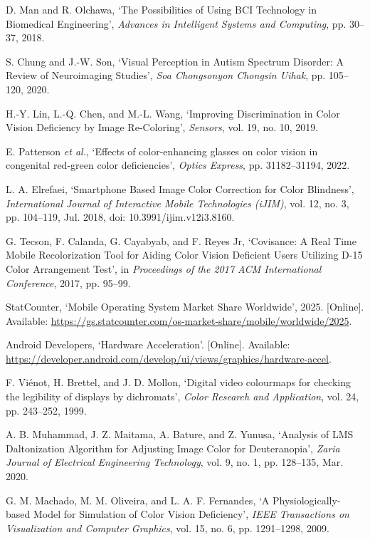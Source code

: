 {\footnotesize
\begin{enumerate}[leftmargin=1.4em, itemsep=0.3em, label={[\arabic*]}]
  \item D. Man and R. Olchawa, `The Possibilities of Using BCI Technology in Biomedical Engineering', \textit{Advances in Intelligent Systems and Computing}, pp. 30--37, 2018.
  \item S. Chung and J.-W. Son, `Visual Perception in Autism Spectrum Disorder: A Review of Neuroimaging Studies', \textit{Soa Chongsonyon Chongsin Uihak}, pp. 105--120, 2020.
  \item H.-Y. Lin, L.-Q. Chen, and M.-L. Wang, `Improving Discrimination in Color Vision Deficiency by Image Re-Coloring', \textit{Sensors}, vol. 19, no. 10, 2019.
  \item E. Patterson \textit{et al.}, `Effects of color-enhancing glasses on color vision in congenital red-green color deficiencies', \textit{Optics Express}, pp. 31182--31194, 2022.
  \item L. A. Elrefaei, `Smartphone Based Image Color Correction for Color Blindness', \textit{International Journal of Interactive Mobile Technologies (iJIM)}, vol. 12, no. 3, pp. 104--119, Jul. 2018, doi: 10.3991/ijim.v12i3.8160.
  \item G. Tecson, F. Calanda, G. Cayabyab, and F. Reyes Jr, `Covisance: A Real Time Mobile Recolorization Tool for Aiding Color Vision Deficient Users Utilizing D-15 Color Arrangement Test', in \textit{Proceedings of the 2017 ACM International Conference}, 2017, pp. 95--99.
  \item StatCounter, `Mobile Operating System Market Share Worldwide', 2025. [Online]. Available: \url{https://gs.statcounter.com/os-market-share/mobile/worldwide/2025}.
  \item Android Developers, `Hardware Acceleration'. [Online]. Available: \url{https://developer.android.com/develop/ui/views/graphics/hardware-accel}.
  \item F. Vi\'enot, H. Brettel, and J. D. Mollon, `Digital video colourmaps for checking the legibility of displays by dichromats', \textit{Color Research and Application}, vol. 24, pp. 243--252, 1999.
  \item A. B. Muhammad, J. Z. Maitama, A. Bature, and Z. Yunusa, `Analysis of LMS Daltonization Algorithm for Adjusting Image Color for Deuteranopia', \textit{Zaria Journal of Electrical Engineering Technology}, vol. 9, no. 1, pp. 128--135, Mar. 2020.
  \item G. M. Machado, M. M. Oliveira, and L. A. F. Fernandes, `A Physiologically-based Model for Simulation of Color Vision Deficiency', \textit{IEEE Transactions on Visualization and Computer Graphics}, vol. 15, no. 6, pp. 1291--1298, 2009.

\end{enumerate}}
